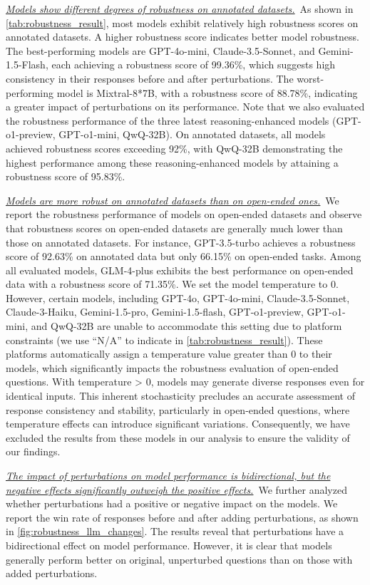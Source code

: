 \textit{\ul{Models show different degrees of robustness on annotated datasets.}}~As shown in \autoref{tab:robustness_result}, most models exhibit relatively high robustness scores on annotated datasets. A higher robustness score indicates better model robustness. The best-performing models are GPT-4o-mini, Claude-3.5-Sonnet, and Gemini-1.5-Flash, each achieving a robustness score of 99.36\%, which suggests high consistency in their responses before and after perturbations. The worst-performing model is Mixtral-8*7B, with a robustness score of 88.78\%, indicating a greater impact of perturbations on its performance.
Note that we also evaluated the robustness performance of the three latest reasoning-enhanced models (GPT-o1-preview, GPT-o1-mini, QwQ-32B). On annotated datasets, all models achieved robustness scores exceeding 92\%, with QwQ-32B demonstrating the highest performance among these reasoning-enhanced models by attaining a robustness score of 95.83\%.

\textit{\ul{Models are more robust on annotated datasets than on open-ended ones.}}~We report the robustness performance of models on open-ended datasets and observe that robustness scores on open-ended datasets are generally much lower than those on annotated datasets. For instance, GPT-3.5-turbo achieves a robustness score of 92.63\% on annotated data but only 66.15\% on open-ended tasks. Among all evaluated models, GLM-4-plus exhibits the best performance on open-ended data with a robustness score of 71.35\%. We set the model temperature to 0. However, certain models, including GPT-4o, GPT-4o-mini, Claude-3.5-Sonnet, Claude-3-Haiku, Gemini-1.5-pro, Gemini-1.5-flash, GPT-o1-preview, GPT-o1-mini, and QwQ-32B are unable to accommodate this setting due to platform constraints (we use ``N/A'' to indicate in \autoref{tab:robustness_result}). These platforms automatically assign a temperature value greater than 0 to their models, which significantly impacts the robustness evaluation of open-ended questions. With temperature > 0, models may generate diverse responses even for identical inputs. This inherent stochasticity precludes an accurate assessment of response consistency and stability, particularly in open-ended questions, where temperature effects can introduce significant variations. Consequently, we have excluded the results from these models in our analysis to ensure the validity of our findings.

\textit{\ul{The impact of perturbations on model performance is bidirectional, but the negative effects significantly outweigh the positive effects.}}~We further analyzed whether perturbations had a positive or negative impact on the models. We report the win rate of responses before and after adding perturbations, as shown in \autoref{fig:robustness_llm_changes}. The results reveal that perturbations have a bidirectional effect on model performance. However, it is clear that models generally perform better on original, unperturbed questions than on those with added perturbations.

